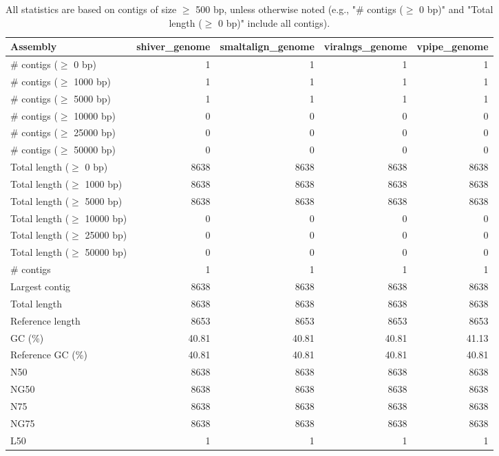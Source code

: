 \documentclass[12pt,a4paper]{article}
\begin{document}
\begin{table}[ht]
\begin{center}
\caption{All statistics are based on contigs of size $\geq$ 500 bp, unless otherwise noted (e.g., "\# contigs ($\geq$ 0 bp)" and "Total length ($\geq$ 0 bp)" include all contigs).}
\begin{tabular}{|l*{4}{|r}|}
\hline
Assembly & shiver\_genome & smaltalign\_genome & viralngs\_genome & vpipe\_genome \\ \hline
\# contigs ($\geq$ 0 bp) & 1 & 1 & 1 & 1 \\ \hline
\# contigs ($\geq$ 1000 bp) & 1 & 1 & 1 & 1 \\ \hline
\# contigs ($\geq$ 5000 bp) & 1 & 1 & 1 & 1 \\ \hline
\# contigs ($\geq$ 10000 bp) & 0 & 0 & 0 & 0 \\ \hline
\# contigs ($\geq$ 25000 bp) & 0 & 0 & 0 & 0 \\ \hline
\# contigs ($\geq$ 50000 bp) & 0 & 0 & 0 & 0 \\ \hline
Total length ($\geq$ 0 bp) & 8638 & 8638 & 8638 & 8638 \\ \hline
Total length ($\geq$ 1000 bp) & 8638 & 8638 & 8638 & 8638 \\ \hline
Total length ($\geq$ 5000 bp) & 8638 & 8638 & 8638 & 8638 \\ \hline
Total length ($\geq$ 10000 bp) & 0 & 0 & 0 & 0 \\ \hline
Total length ($\geq$ 25000 bp) & 0 & 0 & 0 & 0 \\ \hline
Total length ($\geq$ 50000 bp) & 0 & 0 & 0 & 0 \\ \hline
\# contigs & 1 & 1 & 1 & 1 \\ \hline
Largest contig & 8638 & 8638 & 8638 & 8638 \\ \hline
Total length & 8638 & 8638 & 8638 & 8638 \\ \hline
Reference length & 8653 & 8653 & 8653 & 8653 \\ \hline
GC (\%) & 40.81 & 40.81 & 40.81 & 41.13 \\ \hline
Reference GC (\%) & 40.81 & 40.81 & 40.81 & 40.81 \\ \hline
N50 & 8638 & 8638 & 8638 & 8638 \\ \hline
NG50 & 8638 & 8638 & 8638 & 8638 \\ \hline
N75 & 8638 & 8638 & 8638 & 8638 \\ \hline
NG75 & 8638 & 8638 & 8638 & 8638 \\ \hline
L50 & 1 & 1 & 1 & 1 \\ \hline

\end{tabular}
\end{center}
\end{table}
\end{document}
